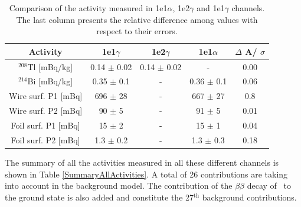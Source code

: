 \documentclass[main.tex]{subfiles}
\begin{document}
\begin{table}[h!]
\centering
\begin{tabular}{c|c|c|c|c}
Activity & 1e1$\gamma$ & 1e2$\gamma$ & 1e1$\alpha$ & $\Delta$ A/ $\sigma$ \\[0.1cm]
\toprule
$^{\text{208}}$Tl [mBq/kg] & 0.14 $\pm$ 0.02 & 0.14 $\pm$ 0.02 & - & 0.00 \\[0.1cm]
$^{\text{214}}$Bi [mBq/kg] & 0.35 $\pm$ 0.1  & -               & 0.36 $\pm$ 0.1 & 0.06 \\[0.1cm]
Wire surf. P1 [mBq]        & 696  $\pm$ 28   & -               & 667  $\pm$ 27  & 0.8  \\[0.1cm]
Wire surf. P2 [mBq]        & 90   $\pm$ 5    & -               & 91   $\pm$ 5   & 0.01 \\[0.1cm]
Foil surf. P1 [mBq]        & 15   $\pm$ 2    & -               & 15   $\pm$ 1   & 0.04 \\[0.1cm]
Foil surf. P2 [mBq]        & 1.3  $\pm$ 0.2  & -               & 1.3  $\pm$ 0.3 & 0.18 \\[0.1cm]
\bottomrule
\end{tabular}
\caption{Comparison of the activity measured in 1e1$\alpha$, 1e2$\gamma$ and 1e1$\gamma$ channels. The last column presents the relative difference among values with respect to their errors.}
\label{Table:BkgValidation}
\end{table}





\NI The summary of all the activities measured in all these different channels is shown in Table \ref{SummaryAllActivities}. A total of 26 contributions are taking into account in the background model. The contribution of the $\beta \beta$ decay of \Cd~to the ground state is also added and constitute the 27$^{\text{th}}$ background contributions.
\end{document}

